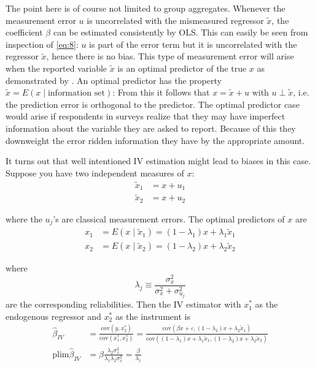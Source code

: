 \documentclass[12pt]{article}
\begin{document}
The point here is of course not limited to group aggregates. Whenever the measurement error $u$ is uncorrelated with the mismeasured regressor $\tilde{x}$, the coefficient $\beta$ can be estimated consistently by OLS. This can easily be seen from inspection of \eqref{eq:8}: $u$ is part of the error term but it is uncorrelated with the regressor $\tilde{x}$, hence there is no bias. This type of measurement error will arise when the reported variable $\tilde{x}$ is an optimal predictor of the true $x$ as demonstrated by \cite{Hyslop_Imbens_2001}. An optimal predictor has the property $\tilde{x} = E(x \mid \text{information set})$: From this it follows that $x = \tilde{x} + u$ with $u \perp \tilde{x}$, i.e. the prediction error is orthogonal to the predictor. The optimal predictor case would arise if respondents in surveys realize that they may have imperfect information about the variable they are asked to report. Because of this they downweight the error ridden information they have by the appropriate amount.

It turns out that well intentioned IV estimation might lead to biases in this case. Suppose you have two independent measures of $x$:
\begin{align*}
\tilde{x}_1 &= x + u_1\\
\tilde{x}_2 &= x + u_2
\end{align*}

where the $u_j$'s are classical measurement errors. The optimal predictors of $x$ are
\begin{equation}
\label{eq:14}
\begin{aligned}
x_1 &= E(x \mid \tilde{x}_1) = (1 - \lambda_1)x + \lambda_1 \tilde{x}_1\\
x_2 &= E(x \mid \tilde{x}_2) = (1 - \lambda_2)x + \lambda_2 \tilde{x}_2
\end{aligned}
\end{equation}

where
\[
\lambda_j \equiv \frac{\sigma_x^2}{\sigma_x^2 + \sigma_{u_j}^2}
\]
are the corresponding reliabilities. Then the IV estimator with $x_1^{*}$ as the endogenous regressor and $x_2^{*}$ as the instrument is
\begin{align*}
\hat{\beta}_{IV} &= \frac{\text{cov}(y, x_2^{*})}{\text{cov}(x_1^{*}, x_2^{*})} = \frac{\text{cov}(\beta x + \varepsilon, (1 - \lambda_2)x + \lambda_2 \tilde{x}_1)}{\text{cov}((1 - \lambda_1)x + \lambda_1 \tilde{x}_1, (1 - \lambda_2)x + \lambda_2 \tilde{x}_2)}\\
\text{plim}\hat{\beta}_{IV} &= \beta \frac{\lambda_2\sigma_x^2}{\lambda_1\lambda_2\sigma_x^2} = \frac{\beta}{\lambda_1}
\end{align*}
\end{document}
